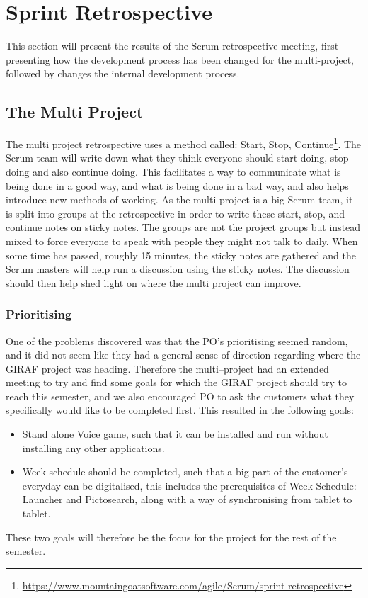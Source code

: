 \section{Sprint Retrospective}\label{s1retro}
This section will present the results of the Scrum retrospective meeting, first presenting how the development process has been changed for the multi-project, followed by changes the internal development process.

\subsection{The Multi Project}\label{retro1}
The multi project retrospective uses a method called: Start, Stop, Continue\footnote{\url{https://www.mountaingoatsoftware.com/agile/Scrum/sprint-retrospective}}.
The Scrum team will write down what they think everyone should start doing, stop doing and also continue doing.
This facilitates a way to communicate what is being done in a good way, and what is being done in a bad way, and also helps introduce new methods of working.
As the multi project is a big Scrum team, it is split into groups at the retrospective in order to write these start, stop, and continue notes on sticky notes.
The groups are not the project groups but instead mixed to force everyone to speak with people they might not talk to daily.
When some time has passed, roughly 15 minutes, the sticky notes are gathered and the Scrum masters will help run a discussion using the sticky notes.
The discussion should then help shed light on where the multi project can improve.

\subsubsection{Prioritising}
One of the problems discovered was that the PO's prioritising seemed random, and it did not seem like they had a general sense of direction regarding where the GIRAF project was heading.
Therefore the multi--project had an extended meeting to try and find some goals for which the GIRAF project should try to reach this semester, and we also encouraged PO to ask the customers what they specifically would like to be completed first.
This resulted in the following goals:
\begin{itemize}
	\item Stand alone Voice game, such that it can be installed and run without installing any other applications.
	\item Week schedule should be completed, such that a big part of the customer's everyday can be digitalised, this includes the prerequisites of Week Schedule: Launcher and Pictosearch, along with a way of synchronising from tablet to tablet.
\end{itemize}
These two goals will therefore be the focus for the project for the rest of the semester.

